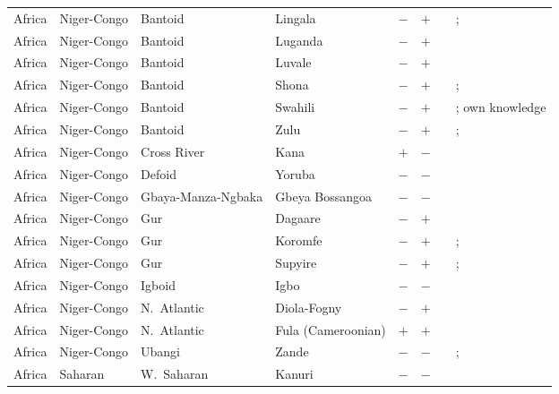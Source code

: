 \begin{landscape}
\begin{longtable}{l>{\raggedright\arraybackslash}p{2.2cm}>{\raggedright}p{2.5cm}>{\raggedright\arraybackslash}p{2.5cm}cc>{\raggedright\arraybackslash}p{3.4cm}>{\raggedright\arraybackslash}p{3.4cm}}
Africa & Niger-Congo & Bantoid & Lingala & $-$ & $+$ & \citealt[23--24]{Meeuwis1998}& \citealt{Corbett2013}; \citealt[110--111]{Kamwangamalu1989}\\
Africa & Niger-Congo & Bantoid & Luganda & $-$ & $+$ & \citealt{Gil2013} & \citealt[295]{Nichols1992}\\
Africa & Niger-Congo & Bantoid & Luvale & $-$ & $+$ & \citealt[36--37, 166--167]{Horton1949} & \citealt[36--37, 166--167]{Horton1949}\\
Africa & Niger-Congo & Bantoid & Shona & $-$ & $+$ & \citealt[108--109, 127]{Fortune1985} & \citealt{Corbett2013}; \citealt[107--126]{Fortune1985}\\
Africa & Niger-Congo & Bantoid & Swahili & $-$ & $+$ & \citealt{Gil2013} & \citealt{Corbett2013}; own knowledge\\
Africa & Niger-Congo & Bantoid & Zulu & $-$ & $+$ & \citealt{Gil2013} & \citealt{Corbett2013}; \citealt[21]{Canonici1995}\\
Africa & Niger-Congo & Cross River & Kana & $+$ & $-$ & \citealt{Gil2013} & \citealt[110--111]{Aikhenvald2000}\\
Africa & Niger-Congo & Defoid & Yoruba & $-$ & $-$ & \citealt{Gil2013} & \citealt{Corbett2013}\\
Africa & Niger-Congo & Gbaya-Manza-Ngbaka & Gbeya Bossangoa & $-$ & $-$ & \citealt{Gil2013} & \citealt[98]{Samarin1966}\\
Africa & Niger-Congo & Gur & Dagaare & $-$ & $+$ & \citealt{Gil2013} & \citealt[45--48]{Grimm2012}\\
Africa & Niger-Congo & Gur & Koromfe & $-$ & $+$ & \citealt{Gil2013} & \citealt{Corbett2013}; \citealt[206--233]{Rennison1997}\\
Africa & Niger-Congo & Gur & Supyire & $-$ & $+$ & \citealt{Gil2013} & \citealt{Corbett2013}; \citealt[75]{Carlson1994}\\
Africa & Niger-Congo & Igboid & Igbo & $-$ & $-$ & \citealt{Gil2013} & \citealt{Corbett2013}\\
Africa & Niger-Congo & N.~Atlantic & Diola-Fogny & $-$ & $+$ & \citealt[74]{Sapir1965}& \citealt[24--25, 61--62]{Sapir1965}\\
Africa & Niger-Congo & N.~Atlantic & Fula (Cameroonian) & $+$ & $+$ & \citealt[295]{Nichols1992}& \citealt[295]{Nichols1992}\\
Africa & Niger-Congo & Ubangi & Zande & $-$ & $-$ & \citealt[42--45]{Gore1926}& \citealt{Corbett2013}; \citealt[20--23]{Gore1926}\\
Africa & Saharan & W.~Saharan & Kanuri & $-$ & $-$ & \citealt{Gil2013} & \citealt{Corbett2013}\\

\end{longtable}
\end{landscape}

